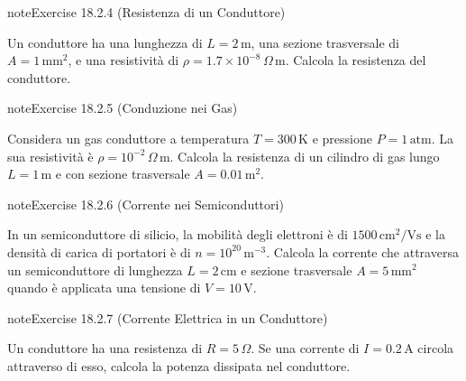 \documentclass[letterpaper,10pt,italian]{jupyterBook}
\begin{document}
\begin{sphinxadmonition}{note}{Exercise 18.2.4 (Resistenza di un Conduttore)}



\sphinxAtStartPar
Un conduttore ha una lunghezza di \(L = 2 \, \text{m}\), una sezione trasversale di \(A = 1 \, \text{mm}^2\), e una resistività di \(\rho = 1.7 \times 10^{-8} \, \Omega \, \text{m}\). Calcola la resistenza del conduttore.
\end{sphinxadmonition}
 \label{exercise:ch/electromagnetism/electric-current-problems-exercise-4}

\begin{sphinxadmonition}{note}{Exercise 18.2.5 (Conduzione nei Gas)}



\sphinxAtStartPar
Considera un gas conduttore a temperatura \(T = 300 \, \text{K}\) e pressione \(P = 1 \, \text{atm}\). La sua resistività è \(\rho = 10^{-2} \, \Omega \, \text{m}\). Calcola la resistenza di un cilindro di gas lungo \(L = 1 \, \text{m}\) e con sezione trasversale \(A = 0.01 \, \text{m}^2\).
\end{sphinxadmonition}
 \label{exercise:ch/electromagnetism/electric-current-problems-exercise-5}

\begin{sphinxadmonition}{note}{Exercise 18.2.6 (Corrente nei Semiconduttori)}



\sphinxAtStartPar
In un semiconduttore di silicio, la mobilità degli elettroni è di \(1500 \, \text{cm}^2/\text{V}\text{s}\) e la densità di carica di portatori è di \(n = 10^{20} \, \text{m}^{-3}\). Calcola la corrente che attraversa un semiconduttore di lunghezza \(L = 2 \, \text{cm}\) e sezione trasversale \(A = 5 \, \text{mm}^2\) quando è applicata una tensione di \(V = 10 \, \text{V}\).
\end{sphinxadmonition}
 \label{exercise:ch/electromagnetism/electric-current-problems-exercise-6}

\begin{sphinxadmonition}{note}{Exercise 18.2.7 (Corrente Elettrica in un Conduttore)}



\sphinxAtStartPar
Un conduttore ha una resistenza di \(R = 5 \, \Omega\). Se una corrente di \(I = 0.2 \, \text{A}\) circola attraverso di esso, calcola la potenza dissipata nel conduttore.
\end{sphinxadmonition}
 \label{exercise:ch/electromagnetism/electric-current-problems-exercise-7}
\end{document}
